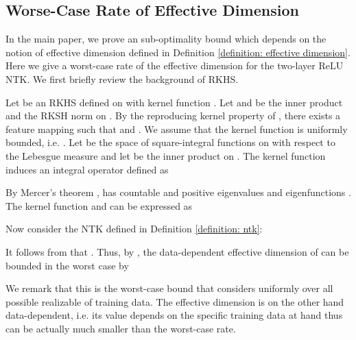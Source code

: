 \documentclass{article} \usepackage{iclr2023/iclr2023_conference,times}
\begin{document}
\color{black}




\subsection{Worse-Case Rate of Effective Dimension}
In the main paper, we prove an  sub-optimality bound which depends on the notion of effective dimension defined in Definition \ref{definition: effective dimension}. Here we give a worst-case rate of the effective dimension  for the two-layer ReLU NTK. We first briefly review the background of RKHS. 


Let  be an RKHS defined on  with kernel function . Let  and  be the inner product and the RKSH norm on . By the reproducing kernel property of , there exists a feature mapping  such that  and . We assume that the kernel function  is uniformly bounded, i.e. . Let  be the space of square-integral functions on  with respect to the Lebesgue measure and let  be the inner product on . The kernel function  induces an integral operator  defined as 


By Mercer's theorem \citep{steinwart2008support},  has countable and positive eigenvalues  and eigenfunctions . The kernel function and  can be expressed as 


Now consider the NTK defined in Definition \ref{definition: ntk}: 


It follows from \cite[Proposition~1]{bietti2019inductive} that . Thus, by \cite[Theorem~5]{srinivas2009gaussian}, the data-dependent effective dimension of  can be bounded in the worst case by  


We remark that this is the worst-case bound that considers uniformly over all possible realizable of training data. The effective dimension  is on the other hand data-dependent, i.e. its value depends on the specific training data at hand thus  can be actually much smaller than the worst-case rate. 
\end{document}

